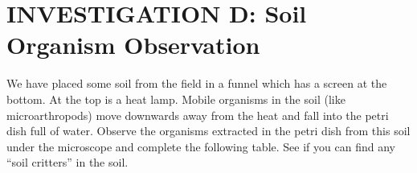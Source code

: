 \documentclass[
  letterpaper,
  twocolumn,
  portrait]{scrbook}
\begin{document}
\hypertarget{investigation-d-soil-organism-observation}{%
\section{INVESTIGATION D: Soil Organism
Observation}\label{investigation-d-soil-organism-observation}}

We have placed some soil from the field in a funnel which has a screen
at the bottom. At the top is a heat lamp. Mobile organisms in the soil
(like microarthropods) move downwards away from the heat and fall into
the petri dish full of water. Observe the organisms extracted in the
petri dish from this soil under the microscope and complete the
following table. See if you can find any ``soil critters'' in the soil.

 
  \providecommand{\huxb}[2]{\arrayrulecolor[RGB]{#1}\global\arrayrulewidth=#2pt}
  \providecommand{\huxvb}[2]{\color[RGB]{#1}\vrule width #2pt}
  \providecommand{\huxtpad}[1]{\rule{0pt}{#1}}
  \providecommand{\huxbpad}[1]{\rule[-#1]{0pt}{#1}}
\end{document}
